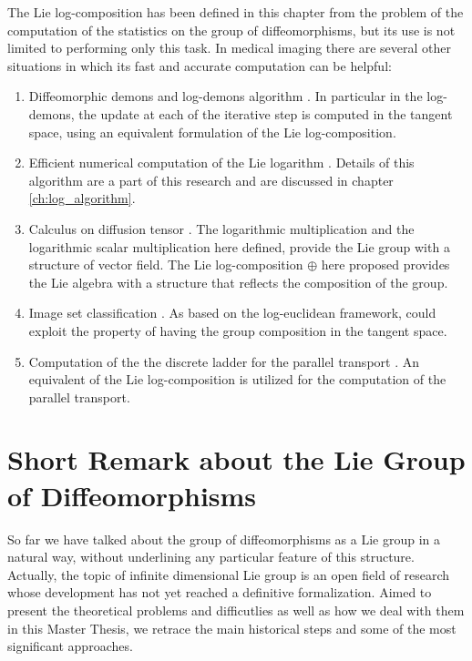 The Lie log-composition has been defined in this chapter from the problem of the computation of the statistics on the group of diffeomorphisms, but its use is not limited to performing only this task.
In medical imaging there are several other situations in which its fast and accurate computation can be helpful:
\begin{enumerate}
	\item Diffeomorphic demons \cite{vercauteren2007non} and log-demons algorithm \cite{vercauteren08}. In particular in the log-demons, the update at each of the iterative step is computed in the tangent space, using an equivalent formulation of the Lie log-composition. 
	\item Efficient numerical computation of the Lie logarithm \cite{Bossa:08}. Details of this algorithm are a part of this research and are discussed in chapter \ref{ch:log_algorithm}.
	\item Calculus on diffusion tensor \cite{Arsigny:MRM:06}. The logarithmic multiplication and the logarithmic scalar multiplication here defined, provide the Lie group with a structure of vector field. The Lie log-composition $\oplus$ here proposed provides the Lie algebra with a structure that reflects the composition of the group.  
	\item Image set classification \cite{huanglog}. As based on the log-euclidean framework, could exploit the property of having the group composition in the tangent space.
	\item Computation of the the discrete ladder for the parallel transport \cite{Lorenzi:discrete_ladders:14}. An equivalent of the Lie log-composition is utilized for the computation of the parallel transport.
\end{enumerate}	


\section{Short Remark about the Lie Group of Diffeomorphisms}\label{remark_diff}

So far we have talked about the group of diffeomorphisms as a Lie group in a natural way, without underlining any particular feature of this structure. Actually, the topic of infinite dimensional Lie group is an open field of research whose development has not yet reached a definitive formalization.
Aimed to present the theoretical problems and difficutlies as well as how we deal with them in this Master Thesis, we retrace the main historical steps and some of the most significant approaches.

